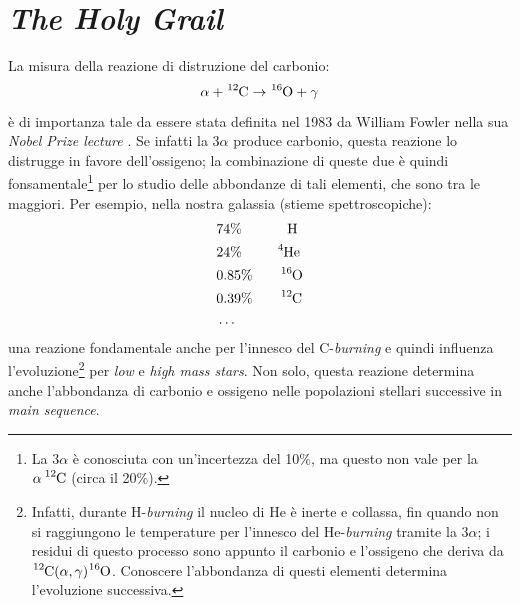 \section{\textit{The Holy Grail}}
La misura della reazione di distruzione del carbonio:
$$\alpha +\ce{^{12}C}\to\ce{^{16}O}+\gamma$$
è di importanza tale da essere stata definita nel 1983 da William Fowler nella sua \textit{Nobel Prize lecture} \textit{}. Se infatti la $3\alpha$ produce carbonio, questa reazione lo distrugge in favore dell'ossigeno; la combinazione di queste due è quindi fonsamentale\footnote{La $3\alpha$ è conosciuta con un'incertezza del 10\%, ma questo non vale per la $\alpha\, \ce{^{12}C}$ (circa il 20\%).} per lo studio delle abbondanze di tali elementi, che sono tra le maggiori. Per esempio, nella nostra galassia (stieme spettroscopiche):
\begin{align*}
	&74\%\qquad\;\quad\ce{H} \\
	&24\%\qquad\;\;\ce{^{4}He} \\
	&0.85\%\qquad\ce{^{16}O} \\
	&0.39\%\qquad\ce{^{12}C} \\
	&\dots
\end{align*}
 una reazione fondamentale anche per l'innesco del C-\textit{burning} e quindi influenza l'evoluzione\footnote{Infatti, durante H-\textit{burning} il nucleo di He è inerte e collassa, fin quando non si raggiungono le temperature per l'innesco del He-\textit{burning} tramite la $3\alpha$; i residui di questo processo sono appunto il carbonio e l'ossigeno che deriva da $\ce{^{12}C}(\alpha,\gamma)\ce{^{16}O}$. Conoscere l'abbondanza di questi elementi determina l'evoluzione successiva.} per \textit{low} e \textit{high mass stars}. Non solo, questa reazione determina anche l'abbondanza di carbonio e ossigeno nelle popolazioni stellari successive in \textit{main sequence}.

